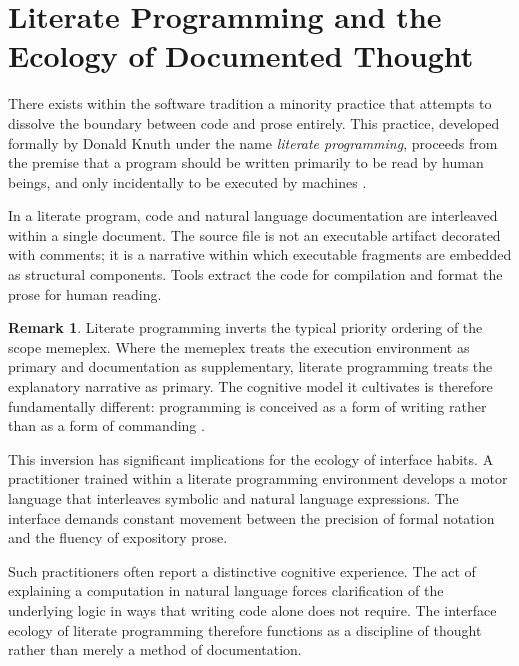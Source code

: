 \documentclass[12pt]{article}
\theoremstyle{definition}
\newtheorem{remark}{Remark}[section]
\begin{document}
\section{Literate Programming and the Ecology of Documented Thought}

There exists within the software tradition a minority practice that
attempts to dissolve the boundary between code and prose entirely. This
practice, developed formally by Donald Knuth under the name
\emph{literate programming}, proceeds from the premise that a program
should be written primarily to be read by human beings, and only
incidentally to be executed by machines \cite{knuth1984}.

In a literate program, code and natural language documentation are
interleaved within a single document. The source file is not an
executable artifact decorated with comments; it is a narrative within
which executable fragments are embedded as structural components. Tools
extract the code for compilation and format the prose for human reading.

\begin{remark}
Literate programming inverts the typical priority ordering of the scope
memeplex. Where the memeplex treats the execution environment as primary
and documentation as supplementary, literate programming treats the
explanatory narrative as primary. The cognitive model it cultivates is
therefore fundamentally different: programming is conceived as a form
of writing rather than as a form of commanding \cite{knuth1984}.
\end{remark}

This inversion has significant implications for the ecology of interface
habits. A practitioner trained within a literate programming environment
develops a motor language that interleaves symbolic and natural language
expressions. The interface demands constant movement between the
precision of formal notation and the fluency of expository prose.

Such practitioners often report a distinctive cognitive experience.
The act of explaining a computation in natural language forces
clarification of the underlying logic in ways that writing code alone
does not require. The interface ecology of literate programming therefore
functions as a discipline of thought rather than merely a method of
documentation.
\end{document}
